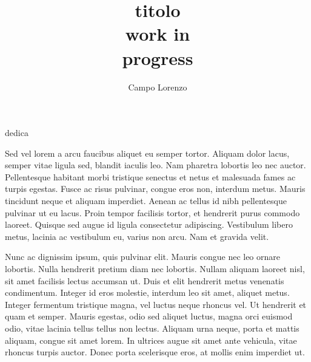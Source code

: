 \documentclass[target=bach,aauheader=,style=]{thud}
\title{titolo \\ work in \\ progress }
\author{Campo Lorenzo}
\begin{document}
\maketitle

\begin{dedication}
	dedica%
\end{dedication}

\acknowledgements
Sed vel lorem a arcu faucibus aliquet eu semper tortor. Aliquam dolor lacus, semper vitae ligula sed, blandit iaculis leo. Nam pharetra lobortis leo nec auctor. Pellentesque habitant morbi tristique senectus et netus et malesuada fames ac turpis egestas. Fusce ac risus pulvinar, congue eros non, interdum metus. Mauris tincidunt neque et aliquam imperdiet. Aenean ac tellus id nibh pellentesque pulvinar ut eu lacus. Proin tempor facilisis tortor, et hendrerit purus commodo laoreet. Quisque sed augue id ligula consectetur adipiscing. Vestibulum libero metus, lacinia ac vestibulum eu, varius non arcu. Nam et gravida velit.

\abstract
Nunc ac dignissim ipsum, quis pulvinar elit. Mauris congue nec leo ornare lobortis. Nulla hendrerit pretium diam nec lobortis. Nullam aliquam laoreet nisl, sit amet facilisis lectus accumsan ut. Duis et elit hendrerit metus venenatis condimentum. Integer id eros molestie, interdum leo sit amet, aliquet metus. Integer fermentum tristique magna, vel luctus neque rhoncus vel. Ut hendrerit et quam et semper. Mauris egestas, odio sed aliquet luctus, magna orci euismod odio, vitae lacinia tellus tellus non lectus. Aliquam urna neque, porta et mattis aliquam, congue sit amet lorem. In ultrices augue sit amet ante vehicula, vitae rhoncus turpis auctor. Donec porta scelerisque eros, at mollis enim imperdiet ut. 

\tableofcontents



\mainmatter

\end{document}
